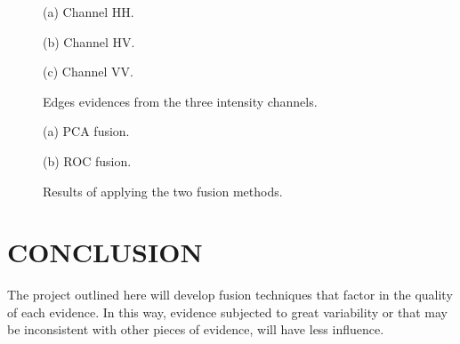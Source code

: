 \documentclass{article}
\begin{document}
 \begin{figure}[htb]
\begin{minipage}[b]{1.0\linewidth}
  \centering
 \centerline{}
  \vspace{-0.1cm}
  \centerline{(a) Channel HH.}\medskip
\end{minipage}
%
\begin{minipage}[b]{.48\linewidth}
  \centering
\centerline{}
  \vspace{-0.1cm}
  \centerline{(b) Channel HV.}\medskip
\end{minipage}
\hfill
\begin{minipage}[b]{0.48\linewidth}
  \centering
 \centerline{}
  \vspace{-0.1cm}
  \centerline{(c) Channel VV.}\medskip
\end{minipage}\vspace{-0.3cm}
%
\caption{Edges evidences from the three intensity channels.}
\label{fig:res}
\vspace{-0.4cm}
\end{figure}
 \begin{figure}[htb]
\begin{minipage}[b]{.48\linewidth}
  \centering
\centerline{}
  \vspace{-0.1cm}
  \centerline{(a) PCA fusion.}\medskip
\end{minipage}
\hfill
\begin{minipage}[b]{0.48\linewidth}
  \centering
 \centerline{}
  \vspace{-0.1cm}
  \centerline{(b) ROC fusion.}\medskip
\end{minipage}\vspace{-0.3cm}
%
\caption{Results of applying the two fusion methods.}
\label{fig:2}
%
\end{figure}

 \vspace{-0.2cm}
\section{CONCLUSION}
\vspace{-0.2cm}
The project outlined here will develop fusion techniques that factor in the quality of each evidence. In this way, evidence subjected to great variability or that may be inconsistent with other pieces of evidence, will have less influence.
\end{document}
